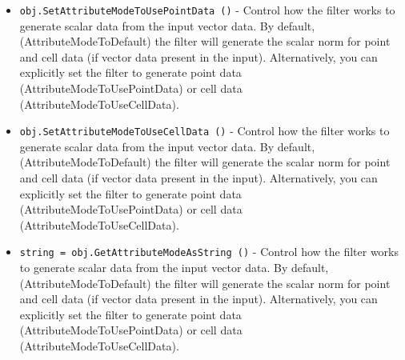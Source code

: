 \begin{itemize}
\item  \verb|obj.SetAttributeModeToUsePointData ()| -  Control how the filter works to generate scalar data from the
 input vector data. By default, (AttributeModeToDefault) the
 filter will generate the scalar norm for point and cell data (if
 vector data present in the input). Alternatively, you can
 explicitly set the filter to generate point data
 (AttributeModeToUsePointData) or cell data
 (AttributeModeToUseCellData).

\item  \verb|obj.SetAttributeModeToUseCellData ()| -  Control how the filter works to generate scalar data from the
 input vector data. By default, (AttributeModeToDefault) the
 filter will generate the scalar norm for point and cell data (if
 vector data present in the input). Alternatively, you can
 explicitly set the filter to generate point data
 (AttributeModeToUsePointData) or cell data
 (AttributeModeToUseCellData).

\item  \verb|string = obj.GetAttributeModeAsString ()| -  Control how the filter works to generate scalar data from the
 input vector data. By default, (AttributeModeToDefault) the
 filter will generate the scalar norm for point and cell data (if
 vector data present in the input). Alternatively, you can
 explicitly set the filter to generate point data
 (AttributeModeToUsePointData) or cell data
 (AttributeModeToUseCellData).

\end{itemize}
